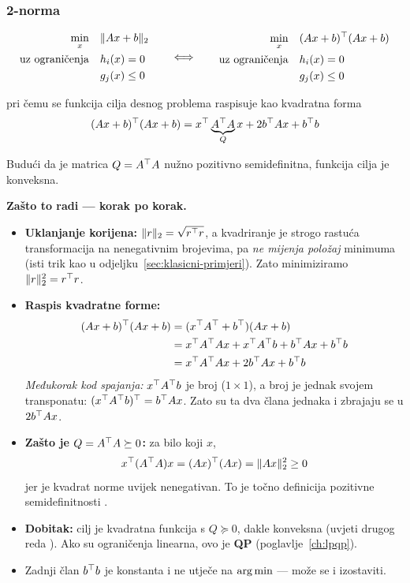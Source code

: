 \subsubsection*{2-norma }

\[
\begin{aligned}
\min_x \quad & \|Ax + b\|_2 \\
\uzogr & h_i(x) = 0 \\
& g_j(x) \le 0
\end{aligned}
\qquad\Longleftrightarrow\qquad
\begin{aligned}
\min_x \quad & (Ax+b)\T(Ax+b) \\
\uzogr & h_i(x) = 0 \\
& g_j(x) \le 0
\end{aligned}
\]

pri čemu se funkcija cilja desnog problema raspisuje kao kvadratna forma
\[
(Ax+b)\T(Ax+b)
= x\T \underbrace{A\T A}_{Q} x + 2b\T Ax + b\T b
\]

Budući da je matrica $Q = A\T A$ nužno pozitivno semidefinitna, funkcija cilja
je konveksna.

\textbf{Zašto to radi --- korak po korak.}
\begin{itemize}
  \item \textbf{Uklanjanje korijena:} $\|r\|_2 = \sqrt{r\T r}$, a kvadriranje
        je strogo rastuća transformacija na nenegativnim brojevima, pa
        \emph{ne mijenja položaj} minimuma (isti trik kao u
        odjeljku~\ref{sec:klasicni-primjeri}). Zato minimiziramo $\|r\|_2^2 = r\T r$.
  \item \textbf{Raspis kvadratne forme:}
        \begin{align}
        (Ax+b)\T(Ax+b)
        &= (x\T A\T + b\T)(Ax + b) \\
        &= x\T A\T Ax + x\T A\T b + b\T Ax + b\T b \\
        &= x\T A\T A x + 2b\T Ax + b\T b
        \end{align}
        \emph{Međukorak kod spajanja:} $x\T A\T b$ je broj ($1\times1$), a broj
        je jednak svojem transponatu: $(x\T A\T b)\T = b\T A x$. Zato su ta dva
        člana jednaka i zbrajaju se u $2b\T Ax$.
  \item \textbf{Zašto je $Q = A\T A \succeq 0$:} za bilo koji $x$,
        \[
        x\T (A\T A) x = (Ax)\T(Ax) = \|Ax\|_2^2 \ge 0
        \]
        jer je kvadrat norme uvijek nenegativan. To je točno definicija
        pozitivne semidefinitnosti . \checkmark
  \item \textbf{Dobitak:} cilj je kvadratna funkcija s $Q \succeq 0$, dakle
        konveksna (uvjeti drugog reda ). Ako su ograničenja linearna,
        ovo je \textbf{QP} (poglavlje~\ref{ch:lpqp}).
  \item Zadnji član $b\T b$ je konstanta i ne utječe na $\argmin$ --- može se
        i izostaviti.
\end{itemize}

